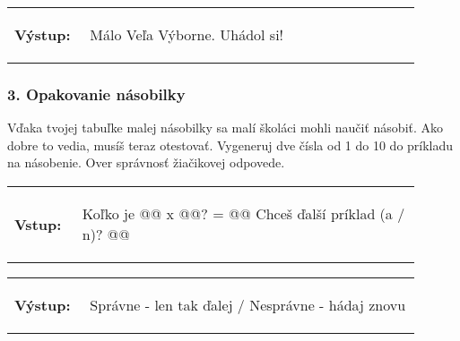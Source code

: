 \vspace{-2em}
\begin{tabular}{@{}p{0.15\linewidth}p{0.75\linewidth}}
\textbf{\small Výstup:} &
\vspace{-3em}
\begin{code}
Málo
Veľa
Výborne. Uhádol si!
\end{code}
\end{tabular}
\vspace{-2em}

\subsubsection*{3. Opakovanie násobilky}
Vďaka tvojej tabuľke malej násobilky sa malí školáci mohli naučiť násobiť. Ako dobre to vedia, musíš teraz otestovať. Vygeneruj dve čísla od 1 do 10 do príkladu na násobenie. Over správnosť žiačikovej odpovede.

\begin{tabular}{@{}p{0.15\linewidth}p{0.75\linewidth}}
\textbf{\small Vstup:} &
\vspace{-3em}
\begin{code}
Koľko je @\fbox{\phantom{vstup}}@ x @\fbox{\phantom{vstup}}@?
= @\fbox{\phantom{vstup}}@
Chceš ďalší príklad (a / n)?  @\fbox{\phantom{vstup}}@
\end{code}
\end{tabular}

\vspace{-2em}
\begin{tabular}{@{}p{0.15\linewidth}p{0.75\linewidth}}
\textbf{\small Výstup:} &
\vspace{-3em}
\begin{code}
Správne - len tak ďalej / Nesprávne - hádaj znovu
\end{code}
\end{tabular}
\vspace{-2em}

